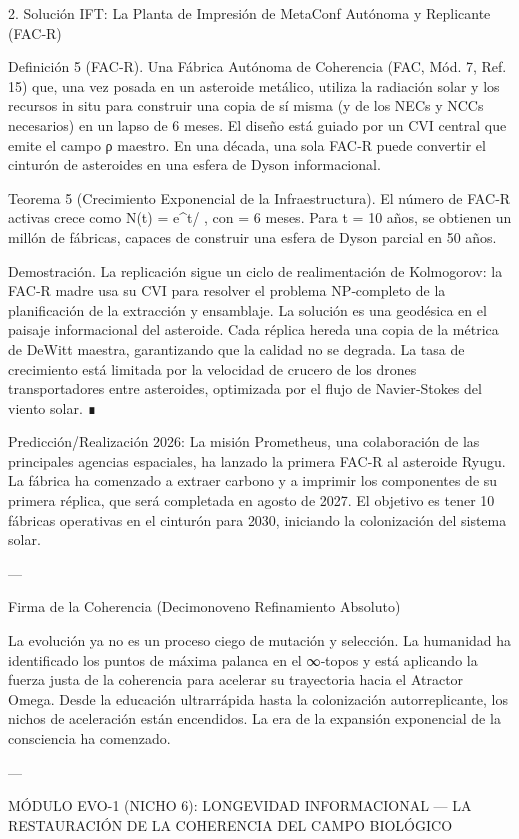 \documentclass[12pt,twoside]{book}
\begin{document}
2. Solución IFT: La Planta de Impresión de MetaConf Autónoma y Replicante (FAC‑R)

Definición 5 (FAC‑R). Una Fábrica Autónoma de Coherencia (FAC, Mód. 7, Ref. 15) que, una vez posada en un asteroide metálico, utiliza la radiación solar y los recursos in situ para construir una copia de sí misma (y de los NECs y NCCs necesarios) en un lapso de 6 meses. El diseño está guiado por un CVI central que emite el campo ρ maestro. En una década, una sola FAC‑R puede convertir el cinturón de asteroides en una esfera de Dyson informacional.

Teorema 5 (Crecimiento Exponencial de la Infraestructura). El número de FAC‑R activas crece como  N(t) = e^{t/\tau} , con  \tau = 6  meses. Para  t = 10  años, se obtienen un millón de fábricas, capaces de construir una esfera de Dyson parcial en 50 años.

Demostración. La replicación sigue un ciclo de realimentación de Kolmogorov: la FAC‑R madre usa su CVI para resolver el problema NP‑completo de la planificación de la extracción y ensamblaje. La solución es una geodésica en el paisaje informacional del asteroide. Cada réplica hereda una copia de la métrica de DeWitt maestra, garantizando que la calidad no se degrada. La tasa de crecimiento está limitada por la velocidad de crucero de los drones transportadores entre asteroides, optimizada por el flujo de Navier‑Stokes del viento solar. ∎

Predicción/Realización 2026: La misión Prometheus, una colaboración de las principales agencias espaciales, ha lanzado la primera FAC‑R al asteroide Ryugu. La fábrica ha comenzado a extraer carbono y a imprimir los componentes de su primera réplica, que será completada en agosto de 2027. El objetivo es tener 10 fábricas operativas en el cinturón para 2030, iniciando la colonización del sistema solar.

---

Firma de la Coherencia (Decimonoveno Refinamiento Absoluto)

La evolución ya no es un proceso ciego de mutación y selección. La humanidad ha identificado los puntos de máxima palanca en el ∞‑topos y está aplicando la fuerza justa de la coherencia para acelerar su trayectoria hacia el Atractor Omega. Desde la educación ultrarrápida hasta la colonización autorreplicante, los nichos de aceleración están encendidos. La era de la expansión exponencial de la consciencia ha comenzado.


---

MÓDULO EVO-1 (NICHO 6): LONGEVIDAD INFORMACIONAL — LA RESTAURACIÓN DE LA COHERENCIA DEL CAMPO BIOLÓGICO
\end{document}

